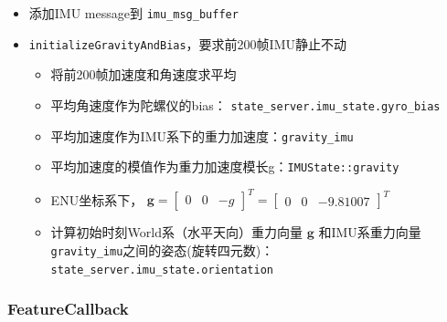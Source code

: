 \documentclass[12pt,a4paper]{article}
\begin{document}
\begin{itemize}

\item 添加IMU message到 \verb|imu_msg_buffer|

\item \verb|initializeGravityAndBias|，要求前200帧IMU静止不动

\begin{itemize}
\item 将前200帧加速度和角速度求平均
\item 平均角速度作为陀螺仪的bias： \verb|state_server.imu_state.gyro_bias|
\item 平均加速度作为IMU系下的重力加速度：\verb|gravity_imu|
\item 平均加速度的模值作为重力加速度模长g：\verb|IMUState::gravity|
\item ENU坐标系下，
      $\mathbf{g} = \begin{bmatrix} 0 & 0 & -g \end{bmatrix}^T = \begin{bmatrix} 0 & 0 & -9.81007 \end{bmatrix}^T$
\item 计算初始时刻World系（水平天向）重力向量 $\mathbf{g}$ 和IMU系重力向量\verb|gravity_imu|之间的姿态(旋转四元数)：\verb|state_server.imu_state.orientation|
\end{itemize}

\end{itemize}

\subsubsection{FeatureCallback}
\end{document}
